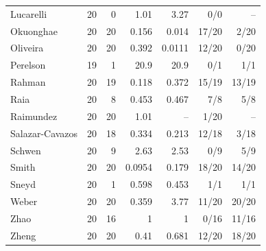 \begin{longtable}{@{}lrrrrrr@{}}
Lucarelli & 20 & 0 & 1.01 & 3.27 & 0/0 & -- \\
Okuonghae & 20 & 20 & 0.156 & 0.014 & 17/20 & 2/20 \\
Oliveira & 20 & 20 & 0.392 & 0.0111 & 12/20 & 0/20 \\
Perelson & 19 & 1 & 20.9 & 20.9 & 0/1 & 1/1 \\
Rahman & 20 & 19 & 0.118 & 0.372 & 15/19 & 13/19 \\
Raia & 20 & 8 & 0.453 & 0.467 & 7/8 & 5/8 \\
Raimundez & 20 & 20 & 1.01 & -- & 1/20 & -- \\
Salazar-Cavazos & 20 & 18 & 0.334 & 0.213 & 12/18 & 3/18 \\
Schwen & 20 & 9 & 2.63 & 2.53 & 0/9 & 5/9 \\
Smith & 20 & 20 & 0.0954 & 0.179 & 18/20 & 14/20 \\
Sneyd & 20 & 1 & 0.598 & 0.453 & 1/1 & 1/1 \\
Weber & 20 & 20 & 0.359 & 3.77 & 11/20 & 20/20 \\
Zhao & 20 & 16 & 1 & 1 & 0/16 & 11/16 \\
Zheng & 20 & 20 & 0.41 & 0.681 & 12/20 & 18/20 \\
\bottomrule
\end{longtable}
